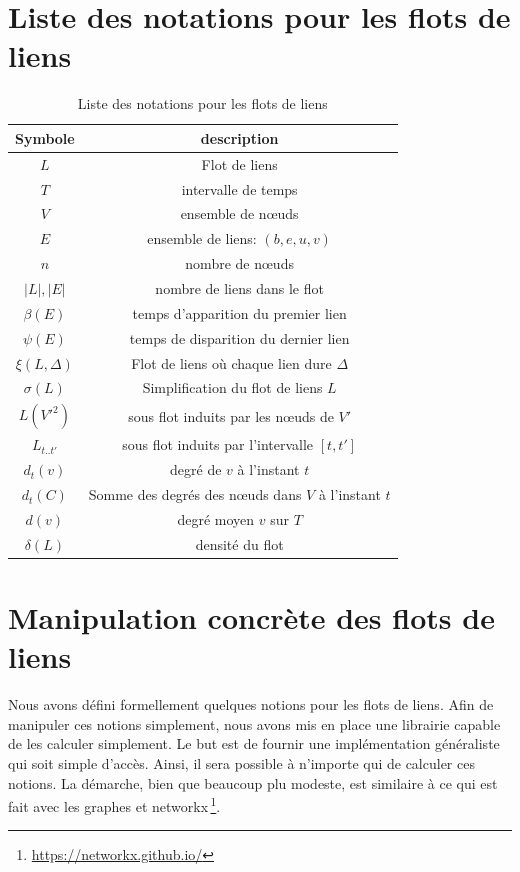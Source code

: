\section*{Liste des notations pour les flots de liens}
\begin{table}[h]
	\centering
	\begin{tabular}{|c|c|}
	\hline Symbole & description \\
	\hline $L$ & Flot de liens \\ 
	$T$ & intervalle de temps  \\
	$V$ & ensemble de n\oe uds\\
	$E$ & ensemble de liens: $(b,e,u,v)$ \\
	$n$ & nombre de n\oe uds  \\
	$|L|,|E|$ & nombre de liens dans le flot \\
	$\beta(E)$ & temps d'apparition du premier lien\\
	$\psi(E)$ & temps de disparition du dernier lien\\
	$\xi(L,\Delta)$ & Flot de liens où chaque lien dure $\Delta$\\
	$\sigma(L)$ & Simplification du flot de liens $L$\\
	$L(V'^2)$ & sous flot induits par les n\oe uds de $V'$ \\
	$L_{t..t'}$ & sous flot induits par l'intervalle $[t,t']$ \\
	$d_t(v)$ & degré de $v$ à l'instant $t$\\
	$d_t(C)$ & Somme des degrés des n\oe uds dans $V$ à l'instant $t$\\
	$d(v)$ & degré moyen $v$ sur $T$\\
	$\delta(L)$ & densité du flot\\
	\hline
	\end{tabular} 
		\caption{Liste des notations pour les flots de liens}
\end{table}

\section{Manipulation concrète des flots de liens}

Nous avons défini formellement quelques notions pour les flots de liens.
Afin de manipuler ces notions simplement, nous avons mis en place une librairie capable de les calculer simplement.
Le but est de fournir une implémentation généraliste qui soit simple d'accès.
Ainsi, il sera possible à n'importe qui de calculer ces notions.
La démarche, bien que beaucoup plu modeste, est similaire à ce qui est fait avec les graphes et networkx\,\footnote{\url{https://networkx.github.io/}}.

